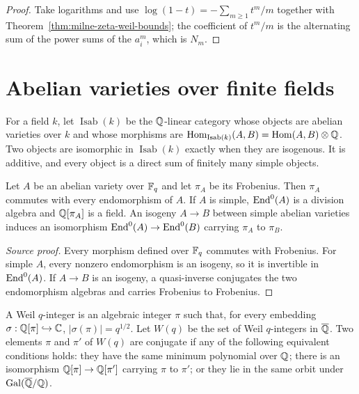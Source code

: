 \begin{proof}
Take logarithms and use $\log(1-t)=-\sum_{m\ge1}t^m/m$ together with
Theorem~\ref{thm:milne-zeta-weil-bounds}; the coefficient of $t^m/m$ is
the alternating sum of the power sums of the $a_i^m$, which is $N_m$.
\end{proof}


\section{Abelian varieties over finite fields}
\begin{definition}\label{def:milne-isogeny-category}
For a field $k$, let $\operatorname{Isab}(k)$ be the $\mathbb{Q}$-linear category whose objects are
abelian varieties over $k$ and whose morphisms are
$\operatorname{Hom}_{\operatorname{Isab}(k)}(A,B)=\operatorname{Hom}(A,B)\otimes\mathbb{Q}$. Two objects are
isomorphic in $\operatorname{Isab}(k)$ exactly when they are isogenous. It is
additive, and every object is a direct sum of finitely many simple objects.
\end{definition}

\begin{lemma}\label{lem:milne-frobenius-isogeny}
Let $A$ be an abelian variety over $\mathbb{F}_q$ and let $\pi_A$ be its Frobenius.
Then $\pi_A$ commutes with every endomorphism of $A$. If $A$ is simple,
$\operatorname{End}^0(A)$ is a division algebra and $\mathbb{Q}[\pi_A]$ is a field. An isogeny
$A\to B$ between simple abelian varieties induces an isomorphism
$\operatorname{End}^0(A)\to\operatorname{End}^0(B)$ carrying $\pi_A$ to $\pi_B$.
\end{lemma}

\begin{proof}[Source proof]
Every morphism defined over $\mathbb{F}_q$ commutes with Frobenius. For simple $A$,
every nonzero endomorphism is an isogeny, so it is invertible in
$\operatorname{End}^0(A)$. If $A\to B$ is an isogeny, a quasi-inverse conjugates the two
endomorphism algebras and carries Frobenius to Frobenius.
\end{proof}

\begin{definition}\label{def:milne-weil-integer}
A Weil $q$-integer is an algebraic integer $\pi$ such that, for every
embedding $\sigma:\mathbb{Q}[\pi]\hookrightarrow\mathbb{C}$,
$|\sigma(\pi)|=q^{1/2}$. Let $W(q)$ be the set of Weil $q$-integers in
$\overline{\mathbb{Q}}$. Two elements $\pi$ and $\pi'$ of $W(q)$ are conjugate if any
of the following equivalent conditions holds: they have the same minimum
polynomial over $\mathbb{Q}$; there is an isomorphism $\mathbb{Q}[\pi]\to\mathbb{Q}[\pi']$ carrying
$\pi$ to $\pi'$; or they lie in the same orbit under
$\operatorname{Gal}(\overline{\mathbb{Q}}/\mathbb{Q})$.
\end{definition}

